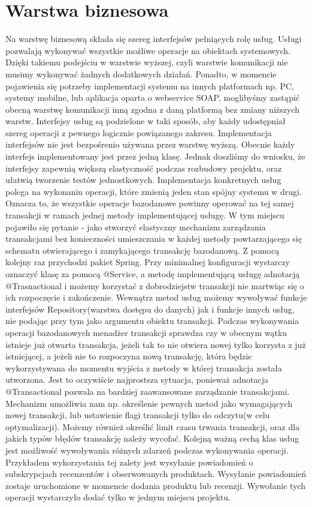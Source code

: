 \section{Warstwa biznesowa}

Na warstwę biznesową składa się szereg interfejsów pełniących rolę usług. Usługi pozwalają wykonywać wszystkie możliwe operacje na obiektach systemowych. Dzięki takiemu podejściu w warstwie wyższej, czyli warstwie komunikacji nie musimy wykonywać żadnych dodatkowych działań. Ponadto, w momencie pojawienia się potrzeby implementacji systemu na innych platformach np. PC, systemy mobilne, lub aplikacja oparta o webservice SOAP, moglibyśmy zastąpić obecną warstwę komunikacji inną zgodna z daną platformą bez zmiany niższych warstw.
Interfejsy usług są podzielone w taki sposób, aby każdy udostępniał szereg operacji z pewnego logicznie powiązanego zakresu. Implementacja interfejsów nie jest bezpośrenio używana przez warstwę wyższą. Obecnie każdy interfejs implementowany jest przez jedną klasę. Jednak doszliśmy do wniosku, że interfejsy zapewnią większą elastyczność podczas rozbudowy projektu, oraz ułatwią tworzenie testów jednostkowych.
Implementacja konkretnych usług polega na wykonaniu operacji, które zmienią jeden stan spójny systemu w drugi. Oznacza to, że wszystkie operacje bazodanowe powinny operować na tej samej transakcji w ramach jednej metody implementującej usługę. W tym miejscu pojawiło się pytanie - jako stworzyć elastyczny mechanizm zarządzania transakcjami bez konieczności umieszczania w każdej metody powtarzającego się schematu otwierającego i zamykającego transakcję bazodanową. Z pomocą kolejny raz przychodzi pakiet Spring. Przy minimalnej konfiguracji wystarczy oznaczyć klasę za pomocą @Service, a metodę implementującą usługę adnotacją @Trasnactional i możemy korzystać z dobrodziejstw transakcji nie martwiąc się o ich rozpoczęcie i zakończenie. Wewnątrz metod usług możemy wywoływać funkcje interfejsów Repository(warstwa dostępu do danych) jak i funkcje innych usług, nie podając przy tym jako argumentu obiektu transakcji. Podczas wykonywania operacji bazodanowych menadżer transakcji sprawdza czy w obecnym wątku istnieje już otwarta transakcja, jeżeli tak to nie otwiera nowej tylko korzysta z już istniejącej, a jeżeli nie to rozpoczyna nową transakcję, która będzie wykorzystywana do momentu wyjścia z metody w której transakcja została utworzona. Jest to oczywiście najprostsza sytuacja, ponieważ adnotacja @Transactional pozwala na bardziej zaawansowane zarządzanie transakcjami. Mechanizm umożliwia nam np. określenie pewnych metod jako wymagających nowej transakcji, lub ustawienie flagi transakcji tylko do odczytu(w celu optymalizacji). Możemy również określić limit czasu trwania transakcji, oraz dla jakich typów błędów transakcję należy wycofać. 
Kolejną ważną cechą klas usług jest możliwość wywoływania różnych zdarzeń podczas wykonywania operacji. Przykładem wykorzystania tej zalety jest wysyłanie powiadomień o subskrypcjach recenzentów i obserwowanych produktach. Wysyłanie powiadomień zostaje uruchomione w momencie dodania produktu lub recenzji. Wywołanie tych operacji wystarczyło dodać tylko w jednym miejscu projektu.

